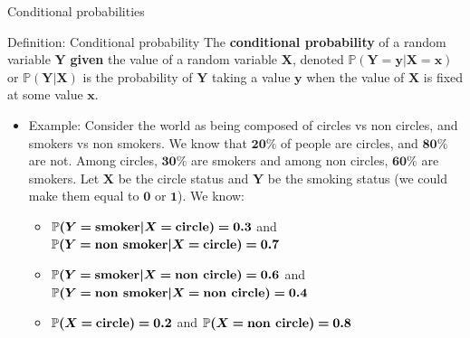 \documentclass[
  ignorenonframetext,
  aspectratio=169]{beamer}
\providecommand{\tightlist}{%
  \setlength{\itemsep}{0pt}\setlength{\parskip}{0pt}}
\begin{document}
\begin{frame}{Conditional probabilities}
\protect\hypertarget{conditional-probabilities}{}
\begin{block}{Definition: Conditional probability}
The \textbf{conditional probability} of a random variable $\bm{Y}$ \textbf{given} the value of a random variable $\bm{X}$, denoted $\bm{\mathbb{P}(Y=y|X=x)}$ or $\bm{\mathbb{P}(Y|X)}$ is the probability of $\bm{Y}$ taking a value $\bm{y}$ when the value of $\bm{X}$ is fixed at some value $\bm{x}$.
\end{block}

\begin{itemize}
\tightlist
\item
  Example: Consider the world as being composed of circles vs non
  circles, and smokers vs non smokers. We know that \(\bm{20\%}\) of
  people are circles, and \(\bm{80\%}\) are not. Among circles,
  \(\bm{30\%}\) are smokers and among non circles, \(\bm{60\%}\) are
  smokers. Let \(\bm{X}\) be the circle status and \(\bm{Y}\) be the
  smoking status (we could make them equal to \(\bm{0}\) or \(\bm{1}\)).
  We know:

  \begin{itemize}
  \tightlist
  \item
    \(\bm{\mathbb{P}(Y=} \textrm{\textbf{smoker}} \bm{|X=} \textrm{\textbf{circle}} \bm{)=0.3}\)
    and
    \(\bm{\mathbb{P}(Y=} \textrm{\textbf{non smoker}} \bm{|X=} \textrm{\textbf{circle}} \bm{)=0.7}\)
  \item
    \(\bm{\mathbb{P}(Y=} \textrm{\textbf{smoker}} \bm{|X=} \textrm{\textbf{non circle}} \bm{)=0.6}\)
    and
    \(\bm{\mathbb{P}(Y=} \textrm{\textbf{non smoker}} \bm{|X=} \textrm{\textbf{non circle}} \bm{)=0.4}\)
  \item
    \(\bm{\mathbb{P}(X=} \textrm{\textbf{circle}} \bm{)=0.2}\) and
    \(\bm{\mathbb{P}(X=} \textrm{\textbf{non circle}} \bm{)=0.8}\)
  \end{itemize}
\end{itemize}
\end{frame}
\end{document}
